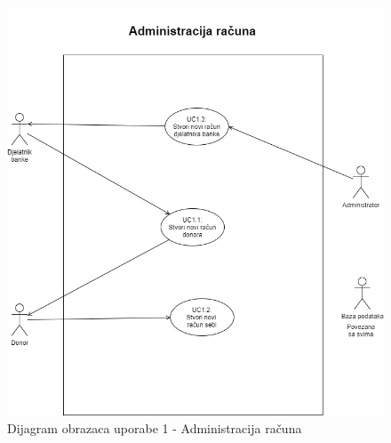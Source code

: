 				
				\begin{figure}[H]
    			\includegraphics[scale=0.6]{slike/UC1.png} %
    			\centering
    			\caption{Dijagram obrazaca uporabe 1 - Administracija računa}
    			\label{fig:promjene}
    	    	\end{figure}
    	    	
